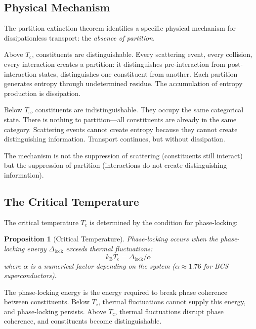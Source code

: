 \documentclass[twocolumn,10pt,aps,prd,superscriptaddress,nofootinbib]{revtex4-2}
\newtheorem{proposition}[theorem]{Proposition}
\theoremstyle{remark}
\newcommand{\kB}{k_{\mathrm{B}}}
\newcommand{\Tcrit}{T_{\mathrm{c}}}
\begin{document}
\subsection{Physical Mechanism}

The partition extinction theorem identifies a specific physical mechanism for dissipationless transport: the \emph{absence of partition}.

Above $\Tcrit$, constituents are distinguishable. Every scattering event, every collision, every interaction creates a partition: it distinguishes pre-interaction from post-interaction states, distinguishes one constituent from another. Each partition generates entropy through undetermined residue. The accumulation of entropy production is dissipation.

Below $\Tcrit$, constituents are indistinguishable. They occupy the same categorical state. There is nothing to partition---all constituents are already in the same category. Scattering events cannot create entropy because they cannot create distinguishing information. Transport continues, but without dissipation.

The mechanism is not the suppression of scattering (constituents still interact) but the suppression of partition (interactions do not create distinguishing information).

\subsection{The Critical Temperature}

The critical temperature $\Tcrit$ is determined by the condition for phase-locking:

\begin{proposition}[Critical Temperature]
\label{prop:critical_temperature}
Phase-locking occurs when the phase-locking energy $\Delta_{\text{lock}}$ exceeds thermal fluctuations:
\begin{equation}
\kB \Tcrit = \Delta_{\text{lock}} / \alpha
\label{eq:critical_temperature}
\end{equation}
where $\alpha$ is a numerical factor depending on the system ($\alpha \approx 1.76$ for BCS superconductors).
\end{proposition}

The phase-locking energy is the energy required to break phase coherence between constituents. Below $\Tcrit$, thermal fluctuations cannot supply this energy, and phase-locking persists. Above $\Tcrit$, thermal fluctuations disrupt phase coherence, and constituents become distinguishable.
\end{document}

